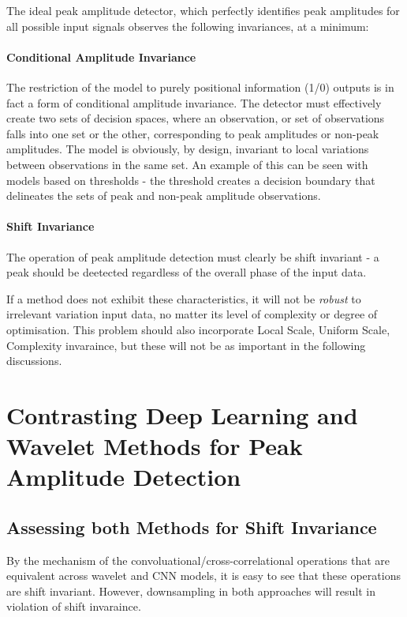 \documentclass[9pt,conference]{IEEEtran}
\begin{document}
The ideal peak amplitude detector, which perfectly identifies peak amplitudes for all possible input signals observes the following invariances, at a minimum:

\paragraph{Conditional Amplitude Invariance}
The restriction of the model to purely positional information (1/0) outputs is in fact a form of conditional amplitude invariance. The detector must effectively create two sets of decision spaces, where an observation, or set of observations falls into one set or the other, corresponding to peak amplitudes or non-peak amplitudes. The model is obviously, by design, invariant to local variations between observations in the same set. An example of this can be seen with models based on thresholds - the threshold creates a decision boundary that delineates the sets of peak and non-peak amplitude observations.

\paragraph{Shift Invariance}
The operation of peak amplitude detection must clearly be shift invariant - a peak should be deetected regardless of the overall phase of the input data.

If a method does not exhibit these characteristics, it will not be \textit{robust} to irrelevant variation input data, no matter its level of complexity or degree of optimisation. This problem should also incorporate Local Scale, Uniform Scale, Complexity invaraince, but these will not be as important in the following discussions.

\section{Contrasting Deep Learning and Wavelet Methods for Peak Amplitude Detection}


\subsection{Assessing both Methods for Shift Invariance}

By the mechanism of the convoluational/cross-correlational operations that are equivalent across wavelet and CNN models, it is easy to see that these operations are shift invariant. However, downsampling in both approaches will result in violation of shift invaraince.
\end{document}
